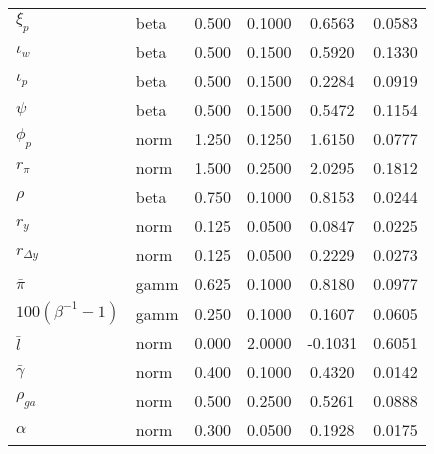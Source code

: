 \begin{center}
\begin{longtable}{llcccc}
${\xi_p}$ & beta &   0.500 & 0.1000 &   0.6563 &  0.0583 \\ 
${\iota_w}$ & beta &   0.500 & 0.1500 &   0.5920 &  0.1330 \\ 
${\iota_p}$ & beta &   0.500 & 0.1500 &   0.2284 &  0.0919 \\ 
${\psi}$ & beta &   0.500 & 0.1500 &   0.5472 &  0.1154 \\ 
${\phi_p}$ & norm &   1.250 & 0.1250 &   1.6150 &  0.0777 \\ 
${r_{\pi}}$ & norm &   1.500 & 0.2500 &   2.0295 &  0.1812 \\ 
${\rho}$ & beta &   0.750 & 0.1000 &   0.8153 &  0.0244 \\ 
${r_{y}}$ & norm &   0.125 & 0.0500 &   0.0847 &  0.0225 \\ 
${r_{\Delta y}}$ & norm &   0.125 & 0.0500 &   0.2229 &  0.0273 \\ 
${\bar \pi}$ & gamm &   0.625 & 0.1000 &   0.8180 &  0.0977 \\ 
${100(\beta^{-1}-1)}$ & gamm &   0.250 & 0.1000 &   0.1607 &  0.0605 \\ 
${\bar l}$ & norm &   0.000 & 2.0000 &  -0.1031 &  0.6051 \\ 
${\bar \gamma}$ & norm &   0.400 & 0.1000 &   0.4320 &  0.0142 \\ 
${\rho_{ga}}$ & norm &   0.500 & 0.2500 &   0.5261 &  0.0888 \\ 
${\alpha}$ & norm &   0.300 & 0.0500 &   0.1928 &  0.0175 \\ 
\end{longtable}
 \end{center}
